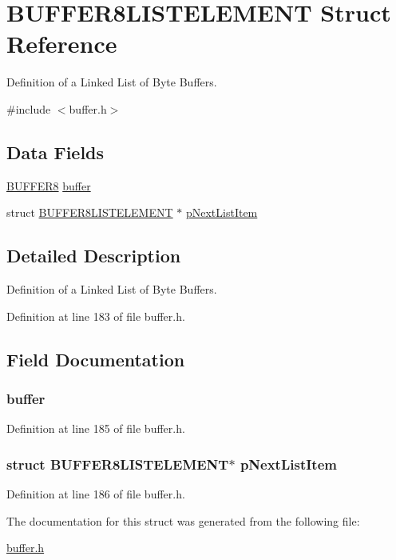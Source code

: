 \hypertarget{a00007}{
\section{BUFFER8LISTELEMENT Struct Reference}
\label{a00007}
}


Definition of a Linked List of Byte Buffers.  




{\ttfamily \#include $<$buffer.h$>$}

\subsection*{Data Fields}
\begin{DoxyCompactItemize}
\item 
\hyperlink{a00006}{BUFFER8} \hyperlink{a00007_a1941d7a126e0456900f127bbe67adfe0}{buffer}
\item 
struct \hyperlink{a00007}{BUFFER8LISTELEMENT} $\ast$ \hyperlink{a00007_ab55d6f070fed22a12c34e880f9a4b961}{pNextListItem}
\end{DoxyCompactItemize}


\subsection{Detailed Description}
Definition of a Linked List of Byte Buffers. 

Definition at line 183 of file buffer.h.



\subsection{Field Documentation}
\hypertarget{a00007_a1941d7a126e0456900f127bbe67adfe0}{
\subsubsection[{buffer}]{ {\bf buffer}}}
\label{a00007_a1941d7a126e0456900f127bbe67adfe0}


Definition at line 185 of file buffer.h.

\hypertarget{a00007_ab55d6f070fed22a12c34e880f9a4b961}{
\subsubsection[{pNextListItem}]{\setlength{\rightskip}{0pt plus 5cm}struct {\bf BUFFER8LISTELEMENT}$\ast$ {\bf pNextListItem}}}
\label{a00007_ab55d6f070fed22a12c34e880f9a4b961}


Definition at line 186 of file buffer.h.



The documentation for this struct was generated from the following file:\begin{DoxyCompactItemize}
\item 
\hyperlink{a00465}{buffer.h}\end{DoxyCompactItemize}
